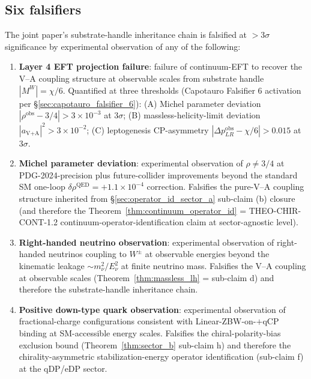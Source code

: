 \documentclass[11pt,letterpaper]{article}
\newcommand{\DeltapLR}{\Delta p_{LR}}
\begin{document}
\subsection{Six falsifiers}
\label{sec:six_falsifiers}

The joint paper's substrate-handle inheritance chain is falsified at $>3\sigma$ significance by experimental observation of any of the following:

\begin{enumerate}[leftmargin=*]
\item \textbf{Layer 4 EFT projection failure}: failure of continuum-EFT to recover the V--A coupling structure at observable scales from substrate handle $|M^W| = \chi/6$. Quantified at three thresholds (Capotauro Falsifier 6 activation per §\ref{sec:capotauro_falsifier_6}): (A) Michel parameter deviation $|\rho^{\text{obs}} - 3/4| > 3 \times 10^{-3}$ at $3\sigma$; (B) massless-helicity-limit deviation $|a_{\text{V+A}}|^2 > 3 \times 10^{-2}$; (C) leptogenesis CP-asymmetry $|\DeltapLR^{\text{obs}} - \chi/6| > 0.015$ at $3\sigma$.

\item \textbf{Michel parameter deviation}: experimental observation of $\rho \neq 3/4$ at PDG-2024-precision plus future-collider improvements beyond the standard SM one-loop $\delta\rho^{\text{QED}} = +1.1 \times 10^{-4}$ correction. Falsifies the pure-V--A coupling structure inherited from §\ref{sec:operator_id_sector_a} sub-claim (b) closure (and therefore the Theorem~\ref{thm:continuum_operator_id} = THEO-CHIR-CONT-1.2 continuum-operator-identification claim at sector-agnostic level).

\item \textbf{Right-handed neutrino observation}: experimental observation of right-handed neutrinos coupling to $W^\pm$ at observable energies beyond the kinematic leakage $\sim m_\nu^2/E_\nu^2$ at finite neutrino mass. Falsifies the V--A coupling at observable scales (Theorem~\ref{thm:massless_lh} = sub-claim d) and therefore the substrate-handle inheritance chain.

\item \textbf{Positive down-type quark observation}: experimental observation of fractional-charge configurations consistent with Linear-ZBW-on-$+$qCP binding at SM-accessible energy scales. Falsifies the chiral-polarity-bias exclusion bound (Theorem~\ref{thm:sector_b} sub-claim h) and therefore the chirality-asymmetric stabilization-energy operator identification (sub-claim f) at the qDP/eDP sector.


\end{enumerate}
\end{document}
